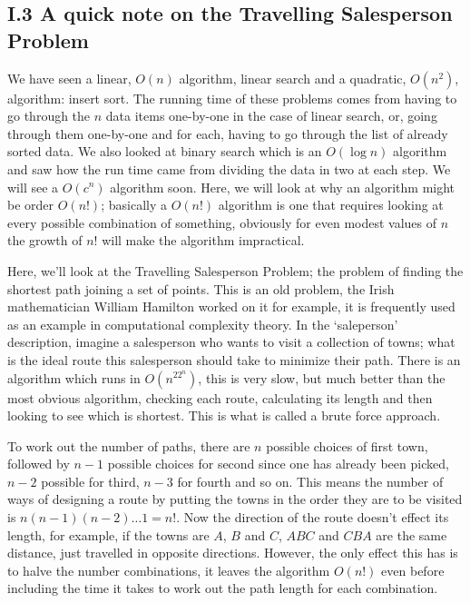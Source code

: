 \documentclass[11pt,a4paper]{scrartcl}
\begin{document}
\subsection*{I.3 A quick note on the Travelling Salesperson Problem}

We have seen a linear, $O(n)$ algorithm, linear search and a
quadratic, $O(n^2)$, algorithm: insert sort. The running time of these
problems comes from having to go through the $n$ data items one-by-one
in the case of linear search, or, going through them one-by-one and
for each, having to go through the list of already sorted data. We
also looked at binary search which is an $O(\log{n})$ algorithm and
saw how the run time came from dividing the data in two at each
step. We will see a $O(c^n)$ algorithm soon. Here, we will look at why
an algorithm might be order $O(n!)$; basically a $O(n!)$ algorithm is
one that requires looking at every possible combination of something,
obviously for even modest values of $n$ the growth of $n!$ will make
the algorithm impractical.

Here, we'll look at the Travelling Salesperson Problem; the problem of
finding the shortest path joining a set of points. This is an old
problem, the Irish mathematician William Hamilton worked on it for
example, it is frequently used as an example in computational
complexity theory. In the \lq{}saleperson\rq{} description, imagine a
salesperson who wants to visit a collection of towns; what is the
ideal route this salesperson should take to minimize their path. There
is an algorithm which runs in $O(n^22^n)$, this is very slow, but much
better than the most obvious algorithm, checking each route,
calculating its length and then looking to see which is shortest. This is what is called a brute force approach.

To work out the number of paths, there are $n$ possible choices of
first town, followed by $n-1$ possible choices for second since one
has already been picked, $n-2$ possible for third, $n-3$ for fourth
and so on. This means the number of ways of designing a route by
putting the towns in the order they are to be visited is
$n(n-1)(n-2)\ldots 1=n!$. Now the direction of the route doesn't
effect its length, for example, if the towns are $A$, $B$ and $C$,
$ABC$ and $CBA$ are the same distance, just travelled in opposite
directions. However, the only effect this has is to halve the number
combinations, it leaves the algorithm $O(n!)$ even before including
the time it takes to work out the path length for each combination.
\end{document}
